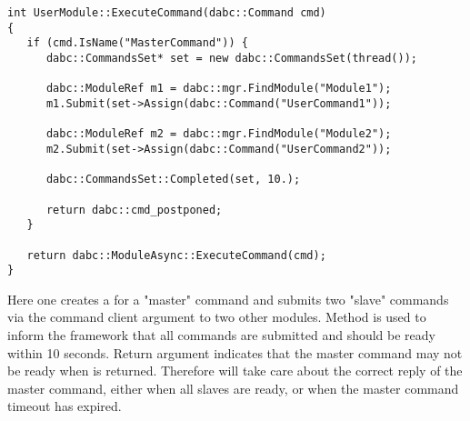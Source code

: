    
\begin{small}
\begin{verbatim}
int UserModule::ExecuteCommand(dabc::Command cmd)
{
   if (cmd.IsName("MasterCommand")) {
      dabc::CommandsSet* set = new dabc::CommandsSet(thread());
      
      dabc::ModuleRef m1 = dabc::mgr.FindModule("Module1");
      m1.Submit(set->Assign(dabc::Command("UserCommand1")); 

      dabc::ModuleRef m2 = dabc::mgr.FindModule("Module2");
      m2.Submit(set->Assign(dabc::Command("UserCommand2")); 

      dabc::CommandsSet::Completed(set, 10.);
      
      return dabc::cmd_postponed;
   } 
      
   return dabc::ModuleAsync::ExecuteCommand(cmd);
}
\end{verbatim}     
\end{small}

Here one creates a  for a "master" command and submits two "slave" commands via the command client argument
to two other modules. Method  is 
used to inform the framework that all commands are submitted and should be ready 
within 10 seconds. Return argument
 indicates that the master command 
may not be ready when  is returned.
Therefore  will take care about the correct reply of 
the master command, either when
all slaves are ready, or when the master command timeout has expired.







